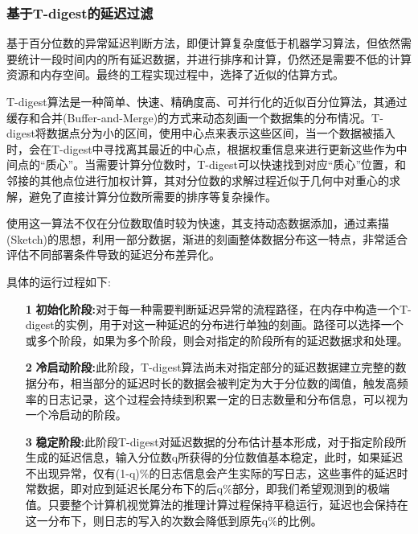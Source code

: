 \documentclass[master,anonymous]{shtthesis}
\begin{document}
\subsubsection{基于T-digest的延迟过滤}\label{基于T-digest的延迟过滤}
基于百分位数的异常延迟判断方法，即便计算复杂度低于机器学习算法，但依然需要统计一段时间内的所有延迟数据，并进行排序和计算，仍然还是需要不低的计算资源和内存空间。最终的工程实现过程中，选择了近似的估算方式。

T-digest\cite{dunning2019computing}算法是一种简单、快速、精确度高、可并行化的近似百分位算法，其通过缓存和合并(Buffer-and-Merge)的方式来动态刻画一个数据集的分布情况。T-digest将数据点分为小的区间，使用中心点来表示这些区间，当一个数据被插入时，会在T-digest中寻找离其最近的中心点，根据权重信息来进行更新这些作为中间点的“质心”。当需要计算分位数时，T-digest可以快速找到对应“质心”位置，和邻接的其他点位进行加权计算，其对分位数的求解过程近似于几何中对重心的求解，避免了直接计算分位数所需要的排序等复杂操作。

使用这一算法不仅在分位数取值时较为快速，其支持动态数据添加，通过素描(Sketch)的思想，利用一部分数据，渐进的刻画整体数据分布这一特点，非常适合评估不同部署条件导致的延迟分布差异化。
\par
具体的运行过程如下:
\begin{itemize}
	\item[\textbf{1}] \textbf{初始化阶段:}对于每一种需要判断延迟异常的流程路径，在内存中构造一个T-digest的实例，用于对这一种延迟的分布进行单独的刻画。路径可以选择一个或多个阶段，如果为多个阶段，则会对指定的阶段所有的延迟数据求和处理。
	\item[\textbf{2}] \textbf{冷启动阶段:}此阶段，T-digest算法尚未对指定部分的延迟数据建立完整的数据分布，相当部分的延迟时长的数据会被判定为大于分位数的阈值，触发高频率的日志记录，这个过程会持续到积累一定的日志数量和分布信息，可以视为一个冷启动的阶段。
	\item[\textbf{3}] \textbf{稳定阶段:}此阶段T-digest对延迟数据的分布估计基本形成，对于指定阶段所生成的延迟信息，输入分位数q所获得的分位数值基本稳定，此时，如果延迟不出现异常，仅有(1-q)$\%$的日志信息会产生实际的写日志，这些事件的延迟时常数据，即对应到延迟长尾分布下的后q$\%$部分，即我们希望观测到的极端值。只要整个计算机视觉算法的推理计算过程保持平稳运行，延迟也会保持在这一分布下，则日志的写入的次数会降低到原先q$\%$的比例。
\end{itemize}
\end{document}
